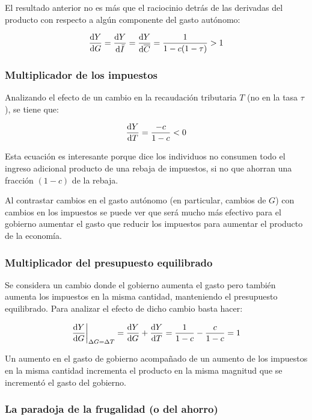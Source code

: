 \documentclass[DeGregorioResumen]{subfiles}
\begin{document}
El resultado anterior no es más que el raciocinio detrás de las derivadas del producto con respecto a algún componente del gasto autónomo:

\begin{equation}
\frac{\mathrm{d}Y}{\mathrm{d}G}=\frac{\mathrm{d}Y}{\mathrm{d}\bar{I}}=\frac{\mathrm{d}Y}{\mathrm{d}\overline{C}} = \frac{1}{1-c(1-\tau)} > 1
\end{equation}

\subsubsection{Multiplicador de los impuestos}

Analizando el efecto de un cambio en la recaudación tributaria $T$ (no en la tasa $\tau$), se tiene que:

\begin{equation}
\frac{\mathrm{d}Y}{\mathrm{d}T} = \frac{-c}{1-c} < 0
\end{equation}

Esta ecuación es interesante porque dice los individuos no consumen todo el ingreso adicional producto de una rebaja de impuestos, si no que ahorran una fracción $(1-c)$ de la rebaja.

Al contrastar cambios en el gasto autónomo (en particular, cambios de $G$) con cambios en los impuestos se puede ver que será mucho más efectivo para el gobierno aumentar el gasto que reducir los impuestos para aumentar el producto de la economía. 

\subsubsection{Multiplicador del presupuesto equilibrado}

Se considera un cambio donde el gobierno aumenta el gasto pero también aumenta los impuestos en la misma cantidad, manteniendo el presupuesto equilibrado. Para analizar el efecto de dicho cambio basta hacer:

\begin{equation}
\frac{\mathrm{d}Y}{\mathrm{d}G}\bigg |_{\Delta G = \Delta T} = \frac{\mathrm{d}Y}{\mathrm{d}G}+\frac{\mathrm{d}Y}{\mathrm{d}T} = \frac{1}{1-c}-\frac{c}{1-c} = 1
\end{equation}

Un aumento en el gasto de gobierno acompañado de un aumento de los impuestos en la misma cantidad incrementa el producto en la misma magnitud que se incrementó el gasto del gobierno.

\subsubsection{La paradoja de la frugalidad (o del ahorro)}
\end{document}
